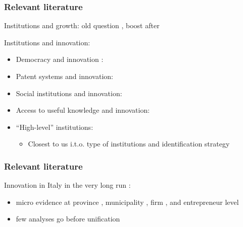 \documentclass[10pt]{beamer}
\begin{document}
\begin{frame}
    \frametitle{Relevant literature}
    
    Institutions and growth: old question \citep{delong1993}, boost after \cite{acemoglu2001, acemoglu2002} \citep{rodrik2004, aghion2007} \\  \bigskip

    Institutions and innovation: %
    \begin{itemize}
        \item Democracy and innovation \citep[the ``Popper hypothesis'', ][]{gao2017}: \cite{aghion2007, acemoglu2019, gao2017, wang2021}
        \item Patent systems and innovation: \cite{moser2005, lerner2009}
        \item Social institutions and innovation: \cite{greif2012}
        \item Access to useful knowledge and innovation: \citep{buonanno2024}
        \item ``High-level'' institutions: \cite{donges2022}
        \begin{itemize}
            \item Closest to us i.t.o. type of institutions and identification strategy 
        \end{itemize}
    \end{itemize}
    


\end{frame}

\begin{frame}
    \frametitle{Relevant literature}
    
    Innovation in Italy in the very long run \citep{barbielliniamidei2013, nuvolari2015b}:
    \begin{itemize}
        \item micro evidence at province \citep{nuvolari2018}, municipality \citep{buonanno2024}, firm \citep{domini2023}, and entrepreneur level \citep{toninelli2014, nuvolari2018, domini2019}
        \item few analyses go before unification \citep{nuvolari2019, nuvolari2020}
    \end{itemize}
    
\end{frame}
\end{document}

